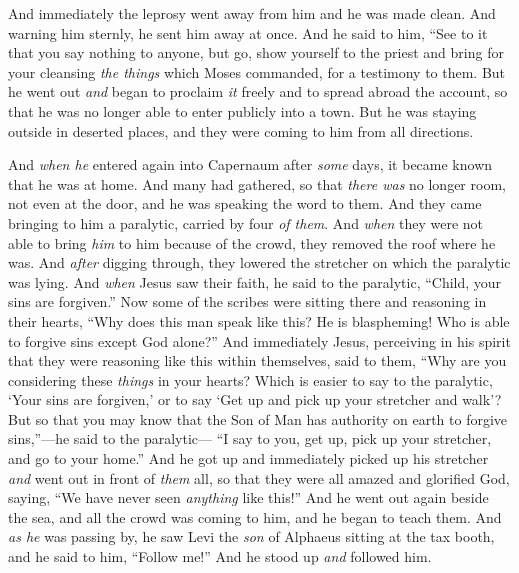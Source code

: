 \begin{biblechapter}
\verse And immediately the leprosy went away from him and he was made clean.
\verse And warning him sternly, he sent him away at once.
\verse And he said to him, “See to it that you say nothing to anyone, but go, show yourself to the priest and bring for your cleansing \textit{the things} which Moses commanded, for a testimony to them.
\verse But he went out \textit{and} began to proclaim \textit{it} freely and to spread abroad the account, so that he was no longer able to enter publicly into a town. But he was staying outside in deserted places, and they were coming to him from all directions.
\end{biblechapter}

\begin{biblechapter} %
 And \textit{when he} entered again into Capernaum after \textit{some} days, it became known that he was at home.
\verse And many had gathered, so that \textit{there was} no longer room, not even at the door, and he was speaking the word to them.
\verse And they came bringing to him a paralytic, carried by four \textit{of them}.
\verse And \textit{when} they were not able to bring \textit{him} to him because of the crowd, they removed the roof where he was. And \textit{after} digging through, they lowered the stretcher on which the paralytic was lying.
\verse And \textit{when} Jesus saw their faith, he said to the paralytic, “Child, your sins are forgiven.”
\verse Now some of the scribes were sitting there and reasoning in their hearts,
\verse “Why does this man speak like this? He is blaspheming! Who is able to forgive sins except God alone?”
\verse And immediately Jesus, perceiving in his spirit that they were reasoning like this within themselves, said to them, “Why are you considering these \textit{things} in your hearts?
\verse Which is easier to say to the paralytic, ‘Your sins are forgiven,’ or to say ‘Get up and pick up your stretcher and walk’?
\verse But so that you may know that the Son of Man has authority on earth to forgive sins,”—he said to the paralytic—
\verse “I say to you, get up, pick up your stretcher, and go to your home.”
\verse And he got up and immediately picked up his stretcher \textit{and} went out in front of \textit{them} all, so that they were all amazed and glorified God, saying, “We have never seen \textit{anything} like this!”
 And he went out again beside the sea, and all the crowd was coming to him, and he began to teach them.
\verse And \textit{as he} was passing by, he saw Levi the \textit{son} of Alphaeus sitting at the tax booth, and he said to him, “Follow me!” And he stood up \textit{and} followed him.

\end{biblechapter}
